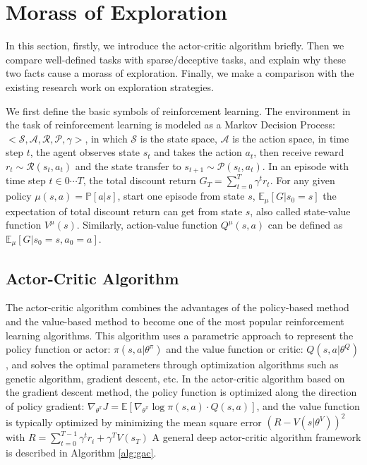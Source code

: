 \section{Morass of Exploration}
In this section, firstly, we introduce the actor-critic algorithm briefly. Then we compare well-defined tasks with sparse/deceptive tasks, and explain why these two facts cause a morass of exploration. Finally, we make a comparison with the existing research work on exploration strategies.

We first define the basic symbols of reinforcement learning. The environment in the task of reinforcement learning is modeled as a Markov Decision Process: $<\mathcal{S},\mathcal{A},\mathcal{R},\mathcal{P},\gamma>$, in which $\mathcal{S}$ is the state space, $\mathcal{A}$ is the action space, in time step $t$, the agent observes state $s_t$ and takes the action $a_t$, then receive reward $r_t \sim \mathcal{R}(s_t,a_t)$ and the state transfer to $s_{t+1}\sim \mathcal{P}(s_t,a_t)$. In an episode with time step $t \in {0 \cdots T}$, the total discount return $G_T = \sum_{t=0}^{T}\gamma^t r_t$. For any given policy $\mu(s,a) = \mathbb{P}[a|s]$,  start one episode from state $s$, $\mathbb{E}_{\mu}[G|s_0=s]$ the expectation of total discount return can get from state $s$, also called state-value function $V^{\mu}(s)$. Similarly, action-value function $Q^{\mu}(s,a)$ can be defined as $\mathbb{E}_{\mu}[G|s_0=s,a_0=a]$.

\subsection{Actor-Critic Algorithm}
The actor-critic algorithm combines the advantages of the policy-based method and the value-based method to become one of the most popular reinforcement learning algorithms. This algorithm uses a parametric approach to represent the policy function or actor: $\pi(s,a|\theta^{\pi})$ and the value function or critic: $Q(s, a|\theta^{Q})$, and solves the optimal parameters through optimization algorithms such as genetic algorithm, gradient descent, etc. In the actor-critic algorithm based on the gradient descent method, the policy function is optimized along the direction of policy gradient: $\nabla_{\theta^{\pi}} J = \mathbb{E}[\nabla_{\theta^{\pi}}\log \pi(s,a)\cdot Q(s,a)]$, and the value function is typically optimized by minimizing the mean square error $(R-V(s|\theta^V))^2$ with $R = \sum_{t=0}^{T-1}\gamma^t r_i +\gamma^TV(s_T)$  A general deep actor-critic algorithm framework is described in Algorithm \ref{alg:gac}.


